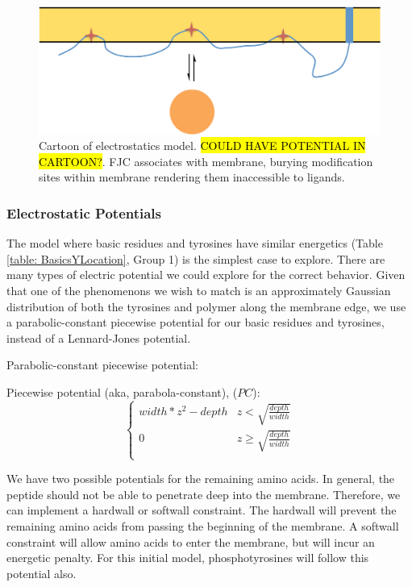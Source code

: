 \documentclass[../../AdvancementSummary.tex]{subfiles}
\begin{document}
\begin{figure}[H]
\begin{center}
    \includegraphics[width=0.7\linewidth]{ElectrostaticsDiagram.pdf}
    \caption{Cartoon of electrostatics model.  \hl{COULD HAVE POTENTIAL IN CARTOON?}. FJC associates with membrane, burying modification sites within membrane rendering them inaccessible to ligands.\label{fig: ElectrostaticsCartoon}}
    \end{center}
\end{figure}


\subsubsection{Electrostatic Potentials}

The model where basic residues and tyrosines have similar energetics (Table \ref{table: BasicsYLocation}, Group 1) is the simplest case to explore. There are many types of electric potential we could explore for the correct behavior.  Given that one of the phenomenons we wish to match is an approximately Gaussian distribution of both the tyrosines and polymer along the membrane edge, we use a parabolic-constant piecewise potential for our basic residues and tyrosines, instead of a Lennard-Jones potential. 

Parabolic-constant piecewise potential:

Piecewise potential (aka, parabola-constant), ($PC$):
\begin{equation}\label{eq: parabolaconstant}
\begin{cases}
width*z^2-depth 	& z<\sqrt{\frac{depth}{width}}\\
0 & z \geq \sqrt{\frac{depth}{width}} \\
\end{cases}
\end{equation}

We have two possible potentials for the remaining amino acids.  In general, the peptide should not be able to penetrate deep into the membrane. Therefore, we can implement a hardwall or softwall constraint. The hardwall will prevent the remaining amino acids from passing the beginning of the membrane. A softwall constraint will allow amino acids to enter the membrane, but will incur an energetic penalty. For this initial model, phosphotyrosines will follow this potential also.
\end{document}

